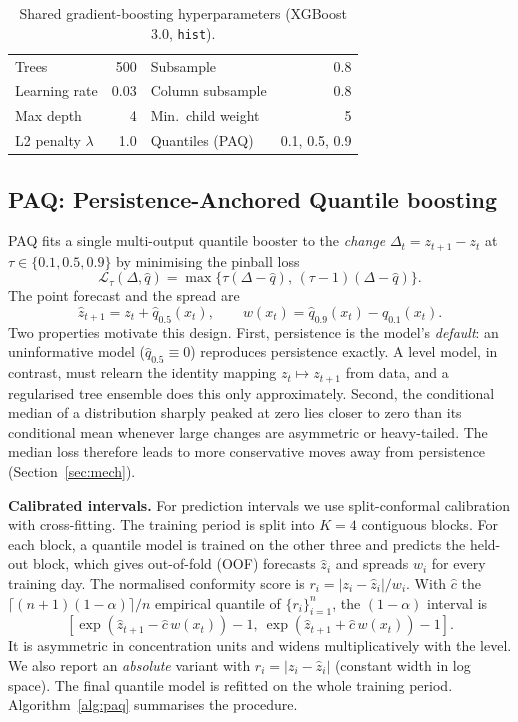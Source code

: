 \documentclass[conference]{IEEEtran}
\begin{document}
\begin{table}[t]
\centering
\caption{Shared gradient-boosting hyperparameters (XGBoost 3.0, \texttt{hist}).}
\label{tab:hp}
\begin{tabular}{lr|lr}
\toprule
Trees & 500 & Subsample & 0.8 \\
Learning rate & 0.03 & Column subsample & 0.8 \\
Max depth & 4 & Min.\ child weight & 5 \\
L2 penalty $\lambda$ & 1.0 & Quantiles (PAQ) & 0.1, 0.5, 0.9 \\
\bottomrule
\end{tabular}
\end{table}

\subsection{PAQ: Persistence-Anchored Quantile boosting}
PAQ fits a single multi-output quantile booster to the \emph{change}
$\Delta_t=z_{t+1}-z_t$ at $\tau\in\{0.1,0.5,0.9\}$ by minimising the pinball loss
\cite{koenker1978}
\begin{equation}
\mathcal L_\tau(\Delta,\hat q)=\max\{\tau(\Delta-\hat q),\,(\tau-1)(\Delta-\hat q)\}.
\end{equation}
The point forecast and the spread are
\begin{equation}
\hat z_{t+1}=z_t+\hat q_{0.5}(x_t),\qquad w(x_t)=\hat q_{0.9}(x_t)-\hat q_{0.1}(x_t).
\end{equation}
Two properties motivate this design. First, persistence is the model's \emph{default}:
an uninformative model ($\hat q_{0.5}\equiv0$) reproduces persistence exactly. A level model,
in contrast, must relearn the identity mapping $z_t\mapsto z_{t+1}$ from data, and a regularised
tree ensemble does this only approximately. Second, the conditional median of a distribution
sharply peaked at zero lies closer to zero than its conditional mean whenever large changes are
asymmetric or heavy-tailed. The median loss therefore leads to more conservative moves away from
persistence (Section~\ref{sec:mech}).

\textbf{Calibrated intervals.} For prediction intervals we use split-conformal
calibration \cite{lei2018,romano2019} with cross-fitting. The training period is split
into $K=4$ contiguous blocks. For each block, a quantile model is trained on the other three and
predicts the held-out block, which gives out-of-fold (OOF) forecasts $\hat z_i$ and spreads $w_i$
for every training day. The normalised conformity score is $r_i=|z_i-\hat z_i|/w_i$. With $\hat c$
the $\lceil(n+1)(1-\alpha)\rceil/n$ empirical quantile of $\{r_i\}_{i=1}^n$, the
$(1-\alpha)$ interval is
\begin{equation}
\left[\exp(\hat z_{t+1}-\hat c\,w(x_t))-1,\ \exp(\hat z_{t+1}+\hat c\,w(x_t))-1\right].
\end{equation}
It is asymmetric in concentration units and widens multiplicatively with the level. We also report
an \emph{absolute} variant with $r_i=|z_i-\hat z_i|$ (constant width in log space). The final
quantile model is refitted on the whole training period. Algorithm~\ref{alg:paq} summarises the
procedure.
\end{document}
